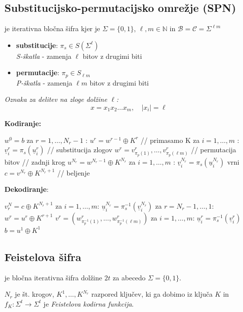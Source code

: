 \begin{multicols}{5}
\subsection*{Substitucijsko-permutacijsko omrežje (SPN)}
je iterativna bločna šifra kjer je $\Sigma = \{0,1\}$, $\ell, m \in \mathbb{N}$ in $\mathcal{B} = \mathcal{C} = \Sigma^{\ell m}$

\begin{itemize}
	\item \textbf{substitucije}: $\pi_s \in S(\Sigma^\ell)$ \\
	\textit{S-škatla} - zamenja $\ell$ bitov z drugimi biti
	\item \textbf{permutacije}: $\pi_p \in S_{\ell m}$ \\
	\textit{P-škatla} - zamenja $\ell m$ bitov z drugimi biti
\end{itemize}

\textit{Oznaka za delitev na zloge dolžine $\ell$:}
\[ x = x_1 x_2 \dots x_m, \quad |x_i| = \ell \]

\textbf{Kodiranje:}
\begin{koda}
$w^0 = b$
za $r = 1, \dots, N_r - 1$ :
	$u^r = w^{r-1} \oplus K^r$ // primasamo K
	za $i = 1, \dots, m$ :
		$\underline{v}_i^r = \pi_s(\underline{u}_i^r)$ // substitucija zlogov
	$w^r = v_{\pi_p(1)}^r, \dots, v_{\pi_p(\ell m)}^r$ // permutacija bitov
// zadnji krog
$u^{N_r} = w^{N_r - 1} \oplus K^{N_r}$
za $ i = 1, \dots, m$ :
	$\underline{v}_i^{N_r} = \pi_s(\underline{u}_i^{N_r})$
vrni $c = v^{N_r} \oplus K^{N_r + 1}$  // beljenje
\end{koda}

\textbf{Dekodiranje}:
\begin{koda}
$v^N_r = c \oplus K^{N_r + 1}$
za $ i = 1, \dots, m$:
	$\underline{u}_i^{N_r} = \pi_s^{-1}(\underline{v}_i^{N_r})$
za $ r = N_r - 1, \dots, 1$:
	$w^r = u^r \oplus K^{r+1}$
	$v^r = (w_{\pi_p^{-1}(1)}^r, \dots, w_{\pi_p^{-1}(\ell m)}^r)$
	za $ i = 1, \dots, m$:
		$\underline{u}^r_i = \pi_s^{-1}(\underline{v}_i^r)$
$b = u^1 \oplus K^1$
\end{koda}

\subsection*{Feistelova šifra}
je bločna iterativna šifra dolžine $2t$ za abecedo $\Sigma = \{0, 1\}$.

$N_r$ je št. krogov, $K^1, \dots, K^{N_r}$ razpored ključev, ki ga dobimo iz ključa
$K$ in $f_K: \Sigma^t \to \Sigma^t$ je \textit{Feistelova kodirna funkcija}.


\end{multicols}
